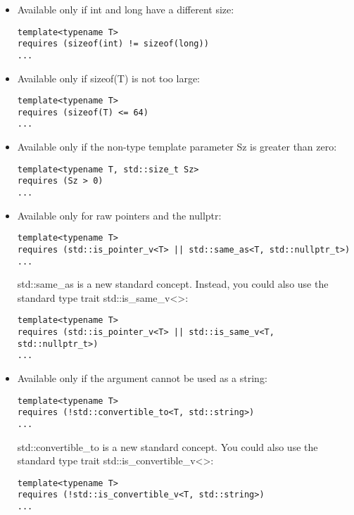 \begin{itemize}
\item
Available only if int and long have a different size:

\begin{lstlisting}[style=styleCXX]
template<typename T>
requires (sizeof(int) != sizeof(long))
...
\end{lstlisting}

\item
Available only if sizeof(T) is not too large:

\begin{lstlisting}[style=styleCXX]
template<typename T>
requires (sizeof(T) <= 64)
...
\end{lstlisting}

\item
Available only if the non-type template parameter Sz is greater than zero:

\begin{lstlisting}[style=styleCXX]
template<typename T, std::size_t Sz>
requires (Sz > 0)
...
\end{lstlisting}

\item
Available only for raw pointers and the nullptr:

\begin{lstlisting}[style=styleCXX]
template<typename T>
requires (std::is_pointer_v<T> || std::same_as<T, std::nullptr_t>)
...
\end{lstlisting}

std::same\_as is a new standard concept. Instead, you could also use the standard type trait std::is\_same\_v<>:

\begin{lstlisting}[style=styleCXX]
template<typename T>
requires (std::is_pointer_v<T> || std::is_same_v<T, std::nullptr_t>)
...
\end{lstlisting}

\item
Available only if the argument cannot be used as a string:

\begin{lstlisting}[style=styleCXX]
template<typename T>
requires (!std::convertible_to<T, std::string>)
...
\end{lstlisting}

std::convertible\_to is a new standard concept. You could also use the standard type trait std::is\_convertible\_v<>:

\begin{lstlisting}[style=styleCXX]
template<typename T>
requires (!std::is_convertible_v<T, std::string>)
...
\end{lstlisting}


\end{itemize}
